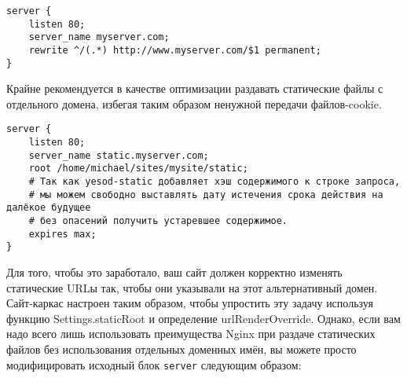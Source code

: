 \begin{lstlisting}
server {
    listen 80;
    server_name myserver.com;
    rewrite ^/(.*) http://www.myserver.com/$1 permanent;
}
\end{lstlisting}
%
%

Крайне рекомендуется в качестве оптимизации раздавать статические файлы с отдельного домена, избегая таким образом ненужной передачи файлов-cookie.

%
\begin{lstlisting}
server {
    listen 80;
    server_name static.myserver.com;
    root /home/michael/sites/mysite/static;
    # Так как yesod-static добавляет хэш содержимого к строке запроса,
    # мы можем свободно выставлять дату истечения срока действия на далёкое будущее
    # без опасений получить устаревшее содержимое.
    expires max;
}
\end{lstlisting}
%

Для того, чтобы это заработало, ваш сайт должен корректно изменять статические URLы так, чтобы они указывали на этот альтернативный домен. Сайт-каркас настроен таким образом, чтобы упростить эту задачу используя функцию Settings.staticRoot и определение urlRenderOverride. Однако, если вам надо всего лишь использовать преимущества Nginx при раздаче статических файлов без использования отдельных доменных имён, вы можете просто модифицировать исходный блок \lstinline{server} следующим образом:
%
%
 

